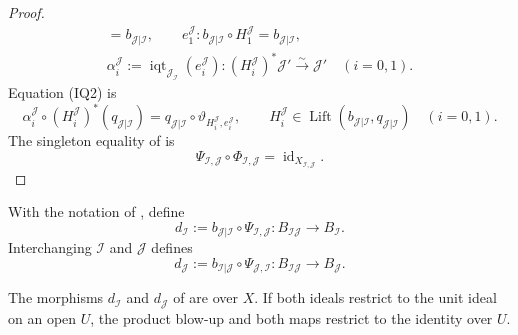 \begin{proof}
\[\begin{gathered}
        =b_{\mathcal J|\mathcal I},\qquad
    e_1^{\mathcal J}\colon
      b_{\mathcal J|\mathcal I}\circ H_1^{\mathcal J}
        =b_{\mathcal J|\mathcal I},\\
    \alpha_i^{\mathcal J}
      :=\operatorname{iqt}_{\mathcal J_{\mathcal I}}(e_i^{\mathcal J})
        \colon(H_i^{\mathcal J})^*\mathcal J'
          \xrightarrow{\sim}\mathcal J'\quad(i=0,1).
  \end{gathered}                                                    \tag{PI6}
  \]
  Equation (IQ2) is
  \[
    \alpha_i^{\mathcal J}\circ
      (H_i^{\mathcal J})^*(q_{\mathcal J|\mathcal I})
      =q_{\mathcal J|\mathcal I}\circ
        \vartheta_{H_i^{\mathcal J},e_i^{\mathcal J}},
    \qquad
    H_i^{\mathcal J}\in
      \operatorname{Lift}(b_{\mathcal J|\mathcal I},
        q_{\mathcal J|\mathcal I})\quad(i=0,1).                  \tag{PI7}
  \]
  The singleton equality of
   is
  \[
    \Psi_{\mathcal I,\mathcal J}\circ\Phi_{\mathcal I,\mathcal J}
      =\operatorname{id}_{X_{\mathcal I,\mathcal J}}.
  \]
\end{proof}

\begin{definition}
  \label{def:nagata-blowup-product-domination-maps}

  With the notation of
  , define
  \[
    d_{\mathcal I}:=
      b_{\mathcal J|\mathcal I}\circ\Psi_{\mathcal I,\mathcal J}\colon
      B_{\mathcal I\mathcal J}\longrightarrow B_{\mathcal I}.
  \]
  Interchanging $\mathcal I$ and $\mathcal J$ defines
  \[
    d_{\mathcal J}:=
      b_{\mathcal I|\mathcal J}\circ\Psi_{\mathcal J,\mathcal I}\colon
      B_{\mathcal I\mathcal J}\longrightarrow B_{\mathcal J}.
  \]
\end{definition}

\begin{corollary}
  \label{cor:nagata-blowup-product-common-refinement}

  The morphisms $d_{\mathcal I}$ and $d_{\mathcal J}$ of
   are over
  $X$.  If both ideals restrict to the unit ideal on an open $U$, the product
  blow-up and both maps restrict to the identity over $U$.
\end{corollary}

